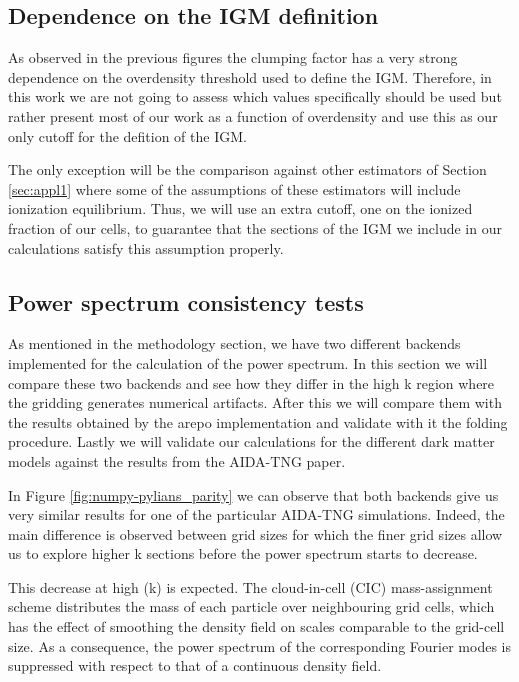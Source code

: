 \documentclass[%
 reprint,
nofootinbib,
 amsmath,amssymb,
 aps,
]{revtex4-2}
\begin{document}
\subsection{Dependence on the IGM definition}
As observed in the previous figures the clumping factor has a very strong dependence on the overdensity threshold used to define the IGM. Therefore, in this work we are not going to assess which values specifically should be used but rather present most of our work as a function of overdensity and use this as our only cutoff for the defition of the IGM. 

The only exception will be the comparison against other estimators of Section \ref{sec:appl1} where some of the assumptions of these estimators will include ionization equilibrium. Thus, we will use an extra cutoff, one on the ionized fraction of our cells, to guarantee that the sections of the IGM we include in our calculations satisfy this assumption properly. 

\subsection{Power spectrum consistency tests}
As mentioned in the methodology section, we have two different backends implemented for the calculation of the power spectrum. In this section we will compare these two backends and see how they differ in the high k region where the gridding generates numerical artifacts. After this we will compare them with the results obtained by the arepo implementation and validate with it the folding procedure. Lastly we will validate our calculations for the different dark matter models against the results from the AIDA-TNG paper.

In Figure \ref{fig:numpy-pylians_parity} we can observe that both backends give us very similar results for one of the particular AIDA-TNG simulations. Indeed, the main difference is observed between grid sizes for which the finer grid sizes allow us to explore higher k sections before the power spectrum starts to decrease.  

This decrease at high (k) is expected. The cloud-in-cell (CIC) mass-assignment scheme distributes the mass of each particle over neighbouring grid cells, which has the effect of  smoothing the density field on scales comparable to the grid-cell size. As a consequence, the power spectrum of the corresponding Fourier modes is suppressed with respect to that of a continuous density field.
\end{document}
